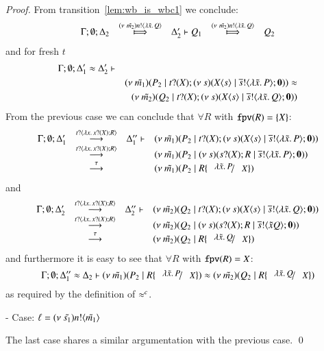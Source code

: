 \begin{proof}
	\noi From transition~\ref{lem:wb_is_wbc1} we conclude:
\[
	\begin{array}{rclcl}
		\Gamma; \es; \Delta_2 &\Hby{\news{\tilde{m_2}} \bactout{n}{\abs{\tilde{x}}{Q}}}& \Delta_2' \proves Q_1 &\Hby{\news{\tilde{m_2}} \bactout{n}{\abs{\tilde{x}}{Q}}}& Q_2\\
	\end{array}
\]
	\noi and for fresh $t$
%
	\begin{eqnarray*}
		\Gamma; \emptyset; \Delta_1' \approx \Delta_2' \vdash && \\
		&& (\nu\ \tilde{m_1})(P_2 \;|\; t ? (X) ; (\nu\ s)(X\langle s \rangle \;|\; \overline{s} ! \langle \lambda \tilde{x}.\,P \rangle ; \mathbf{0})) \approx\\
		&& (\nu\ \tilde{m_2})(Q_2 \;|\; t ? (X) ; (\nu\ s)(X\langle s \rangle \;|\; \overline{s} ! \langle \lambda \tilde{x}.\,Q \rangle ; \mathbf{0})) 
	\end{eqnarray*}
%
	\noi From the  previous case we can conclude that $\forall R$ with $\mathtt{fpv}(R) = \{X\}$:
\[
	\begin{array}{rcll}
		\Gamma; \es; \Delta_1' &\by{\bactinp{t}{\abs{x}{\binp{x}{X} R}}}& \Delta_1'' \proves& \newsp{\tilde{m_1}}{P_2 \Par \binp{t}{X} \newsp{s}{\appl{X}{s} \Par \bout{\dual{s}}{\abs{\tilde{x}}{P}} \inact}} \\
		&\by{\bactinp{t}{\abs{x}{\binp{x}{X} R}}}& &\newsp{\tilde{m_1}}{P_2 \Par \newsp{s}{\binp{s}{X} R \Par \bout{\dual{s}}{\abs{\tilde{x}}{P}} \inact}}\\
		&\by{\tau}&& \newsp{\tilde{m_1}}{P_2 \Par  R \subst{\abs{\tilde{x}}{P}}{X}}
	\end{array}
\]
	\noi and
\[
	\begin{array}{rcll}
		\Gamma; \es; \Delta_2' &\by{\bactinp{t}{\abs{x}{\binp{x}{X} R}}}& \Delta_2'' \proves& \newsp{\tilde{m_2}}{Q_2 \Par \binp{t}{X} \newsp{s}{\appl{X}{s} \Par \bout{\dual{s}}{\abs{\tilde{x}}{Q}} \inact}} \\
		 &\by{\bactinp{t}{\abs{x}{\binp{x}{X} R}}}& &\newsp{\tilde{m_2}}{Q_2 \Par \newsp{s}{\binp{s}{X} R \Par \bout{\dual{s}}{{\tilde{x}}{Q}} \inact}}\\
		&\by{\tau}&& \newsp{\tilde{m_2}}{Q_2 \Par  R \subst{\abs{\tilde{x}}{Q}}{X}}
	\end{array}
\]
	\noi and furthermore it is easy to see that $\forall R$ with $\mathtt{fpv}(R) = X$:
\[
	\Gamma; \es; \Delta_1'' \wb \Delta_2 \proves \newsp{\tilde{m_1}}{P_2 \Par  R \subst{\abs{\tilde{x}}{P}}{X}} \wb \newsp{\tilde{m_2}}{Q_2 \Par R \subst{\abs{\tilde{x}}{Q}}{X}}
\]
	\noi as required by the definition of $\approx^{c}$.


	\noi - Case: $\ell = (\nu\ \tilde{s_1}) n ! \langle \tilde{m_1} \rangle$

	The last case shares a similar argumentation with the previous case.
	\qed
\end{proof}


